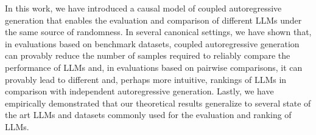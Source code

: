 In this work, we have introduced a causal model of coupled autoregressive generation that enables the evaluation and comparison of different LLMs under the same source of randomness.
%
In several canonical settings, we have shown that, in evaluations based on benchmark datasets, coupled autoregressive generation can provably reduce the number of samples required to reliably compare the performance of LLMs and, in evaluations based on pairwise comparisons, it can provably lead to different and, perhaps more intuitive, rankings of LLMs in comparison with independent autoregressive generation. 
%
Lastly, we have empirically demonstrated that our theoretical results generalize to several state of the art LLMs and datasets commonly used for the evaluation and ranking of LLMs.